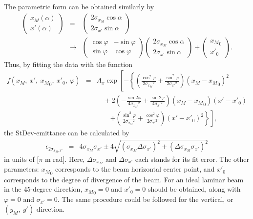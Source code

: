 \documentclass{article}
\begin{document}
The parametric form can be obtained similarly by
\begin{eqnarray*}
\left(
\begin{array}{c}
	x_M (\alpha) \\
	x' (\alpha)
\end{array} \right) & = & \left(
\begin{array}{c}
	2\sigma_{x_M} \cos{\alpha} \\
	2\sigma_{x'} \sin{\alpha}
\end{array} \right) \\
& \rightarrow & \left(
\begin{array}{cc}
	\cos{\varphi} & -\sin{\varphi} \\
	\sin{\varphi} & \cos{\varphi}
\end{array} \right) \left(
\begin{array}{c}
	2\sigma_{x_M} \cos{\alpha} \\
	2\sigma_{x'} \sin{\alpha}
\end{array} \right) + \left(
\begin{array}{c}
	{x_M}_0 \\
	{x'}_0
\end{array} \right).
\end{eqnarray*}
Thus, by fitting the data with the function 
\begin{eqnarray*}
f\left(x_M,\ x',\ {x_M}_0,\ {x'}_0,\ \varphi\right) & = & A_x \exp \left[ -\left\{ \left( \frac{\cos^2{\varphi}}{2{\sigma_{x_M}}^2} + \frac{\sin^2{\varphi}}{2{\sigma_{x'}}^2} \right) \left( x_M-{x_M}_0 \right)^2 \right. \right. \\
& & \, \, \, \, \, \, + 2 \left( -\frac{\sin{2\varphi}}{4{\sigma_{x_M}}^2} + \frac{\sin{2\varphi}}{4{\sigma_{x'}}^2} \right) \left( x_M-{x_M}_0 \right) \left( x'-{x'}_0 \right) \\
& & \, \, \, \, \, \, \, \, \, \, \, \, \left. \left. + \left( \frac{\sin^2{\varphi}}{2{\sigma_{x_M}}^2} + \frac{\cos^2{\varphi}}{2{\sigma_{x'}}^2} \right) \left( x'-{x'}_0 \right)^2 \right\} \right],
\end{eqnarray*}
the StDev-emittance can be calculated by
\begin{eqnarray*}
\epsilon_{2\sigma_{x_M,x'}} & = & 4\sigma_{x_M} \sigma_{x'} \pm 4\sqrt{\left( \sigma_{x_M} \Delta \sigma_{x'} \right)^2 + \left( \Delta \sigma_{x_M} \sigma_{x'}  \right)^2 }
\end{eqnarray*}
in units of [$\pi$ m rad]. Here, $\Delta \sigma_{x_M}$ and $\Delta \sigma_{x'}$ each stands for its fit error. The other parameters: ${x_M}_0$ corresponds to the beam horizontal center point, and ${x'}_0$ corresponds to the degree of divergence of the beam. For an ideal laminar beam in the 45-degree direction, ${x_M}_0 = 0$ and ${x'}_0 = 0$ should be obtained, along with $\varphi = 0$ and $\sigma_{x'} = 0$. The same procedure could be followed for the vertical, or $\left(y_M,\ y'\right)$ direction.
\end{document}
